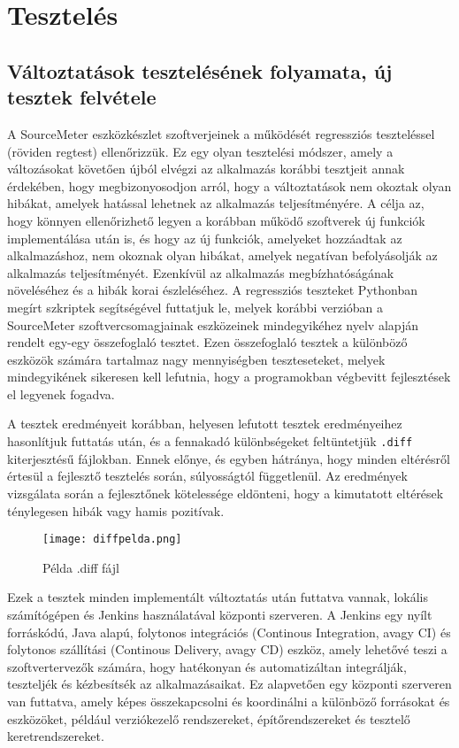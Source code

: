 \chapter{Tesztelés}
\label{chap:fejezet5}

\section{Változtatások tesztelésének folyamata, új tesztek felvétele}

A SourceMeter eszközkészlet szoftverjeinek a működését regressziós teszteléssel (röviden regtest) ellenőrizzük. Ez egy olyan tesztelési módszer, amely a változásokat követően újból elvégzi az alkalmazás korábbi tesztjeit annak érdekében, hogy megbizonyosodjon arról, hogy a változtatások nem okoztak olyan hibákat, amelyek hatással lehetnek az alkalmazás teljesítményére.
A célja az, hogy könnyen ellenőrizhető legyen a korábban működő szoftverek új funkciók implementálása után is, és hogy az új funkciók, amelyeket hozzáadtak az alkalmazáshoz, nem okoznak olyan hibákat, amelyek negatívan befolyásolják az alkalmazás teljesítményét. Ezenkívül az alkalmazás megbízhatóságának növeléséhez és a hibák korai észleléséhez.
A regressziós teszteket Pythonban megírt szkriptek segítségével futtatjuk le, melyek korábbi verzióban a SourceMeter szoftvercsomagjainak eszközeinek mindegyikéhez nyelv alapján rendelt egy-egy összefoglaló tesztet. Ezen összefoglaló tesztek a különböző eszközök számára tartalmaz nagy mennyiségben teszteseteket, melyek mindegyikének sikeresen kell lefutnia, hogy a programokban végbevitt fejlesztések el legyenek fogadva.

A tesztek eredményeit korábban, helyesen lefutott tesztek eredményeihez hasonlítjuk futtatás után, és a fennakadó különbségeket feltüntetjük \texttt{.diff} kiterjesztésű fájlokban. Ennek előnye, és egyben hátránya, hogy minden eltérésről értesül a fejlesztő tesztelés során, súlyosságtól függetlenül. Az eredmények vizsgálata során a fejlesztőnek kötelessége eldönteni, hogy a kimutatott eltérések ténylegesen hibák vagy hamis pozitívak.

\begin{figure}[!htbp]
    \caption{Példa .diff fájl}\label{fig:difffile}
    \centering
    \texttt{[image: diffpelda.png]}
\end{figure}

Ezek a tesztek minden implementált változtatás után futtatva vannak, lokális számítógépen és Jenkins használatával központi szerveren. 
A Jenkins egy nyílt forráskódú, Java alapú, folytonos integrációs (Continous Integration, avagy CI) és folytonos szállítási (Continous Delivery, avagy CD) eszköz, amely lehetővé teszi a szoftvertervezők számára, hogy hatékonyan és automatizáltan integrálják, teszteljék és kézbesítsék az alkalmazásaikat. Ez alapvetően egy központi szerveren van futtatva, amely képes összekapcsolni és koordinálni a különböző forrásokat és eszközöket, például verziókezelő rendszereket, építőrendszereket és tesztelő keretrendszereket.

